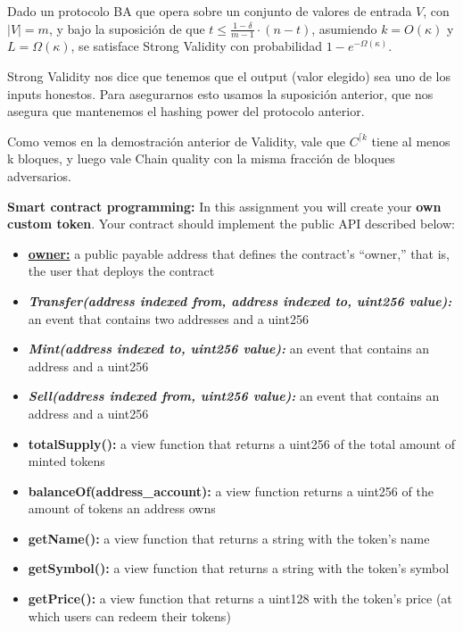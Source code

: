 \documentclass[12pt,addpoints,answers]{exam}
\begin{document}
\begin{questions}
\begin{parts}
    \begin{solution} %
        Dado un protocolo BA que opera sobre un conjunto de valores de entrada $V$, con $|V| = m$, y bajo la suposición de que $t \le \frac{1-\delta}{m-1} \cdot (n-t)$, asumiendo $k = O(\kappa)$ y $L = \Omega(\kappa)$, se satisface Strong Validity con probabilidad $1 - e^{-\Omega(\kappa)}$.

        Strong Validity nos dice que tenemos que el output (valor elegido) sea uno de los inputs honestos. Para asegurarnos esto usamos la suposición anterior, que nos asegura que mantenemos el hashing power del protocolo anterior.

        Como vemos en la demostración anterior de Validity, vale que $C^{\lceil k}$ tiene al menos k bloques, y luego vale Chain quality con la misma fracción de bloques adversarios.
        
    \end{solution}

\end{parts}

\newpage

\question \textbf{Smart contract programming:}  In this assignment you will create your {\bf own custom token}. Your contract should implement the public API described below:

\begin{itemize}
\item \underline{\textbf{owner:}} a public payable address that defines the contract’s ``owner,'' that is, the user that deploys the contract
\item \textbf{\textit{Transfer(address indexed from, address indexed to, uint256 value):}} an event that contains two addresses and a uint256
\item \textbf{\textit{Mint(address indexed to, uint256 value):}} an event that contains an address and a uint256
\item \textbf{\textit{Sell(address indexed from, uint256 value):}} an event that contains an address and a uint256

\item \textbf{totalSupply():} a view function that returns a uint256 of the total amount of minted tokens
\item \textbf{balanceOf(address\_account):} a view function returns a uint256 of the amount of tokens
an address owns
\item \textbf{getName():} a view function that returns a string with the token’s name
\item \textbf{getSymbol():} a view function that returns a string with the token’s symbol
\item \textbf{getPrice():} a view function that returns a uint128 with the token’s price (at which users can
redeem their tokens)


\end{itemize}
\end{questions}
\end{document}
